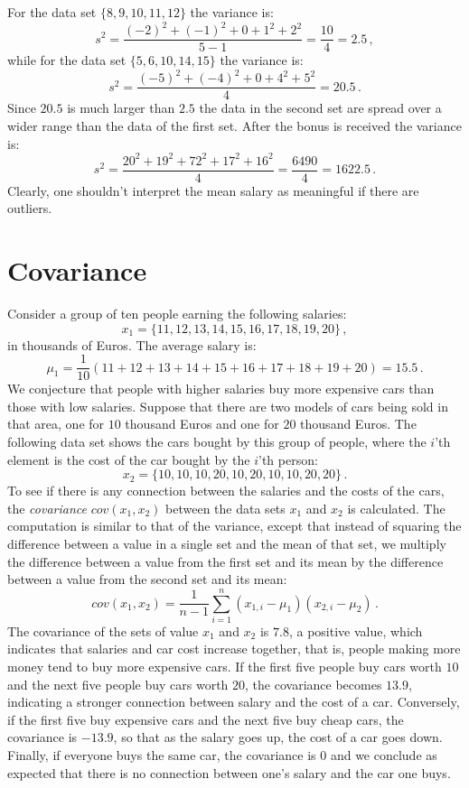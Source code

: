 For the data set $\{8,9,10,11,12\}$ the variance is:
\[
s^2 = \frac{(-2)^2+(-1)^2+0+1^2+2^2}{5-1} = \frac{10}{4} = 2.5\,,
\]
while for the data set $\{5,6,10,14,15\}$ the variance is:
\[
s^2 = \frac{(-5)^2+(-4)^2+0+4^2+5^2}{4} = 20.5\,.
\]
Since $20.5$ is much larger than $2.5$ the data in the second set are spread over a wider range than the data of the first set. After the bonus is received the variance is:
\[
s^2 = \frac{20^2+19^2+72^2+17^2+16^2}{4} = \frac{6490}{4} = 1622.5\,.
\]
Clearly, one shouldn't interpret the mean salary as meaningful if there are outliers.

\section{Covariance}\label{a.covariance}

Consider a group of ten people earning the following salaries:
\[x_1=\{11,12,13,14,15,16,17,18,19,20\}\,,
\]
in thousands of Euros. The average salary is:
\[
\mu_1=\frac{1}{10}(11+12+13+14+15+16+17+18+19+20)=15.5\,.
\]
We conjecture that people with higher salaries buy more expensive cars than those with low salaries. Suppose that there are two models of cars being sold in that area, one for $10$ thousand Euros and one for $20$ thousand Euros. The following data set shows the cars bought by this group of people, where the $i$'th element is the cost of the car bought by the $i$'th person:
\[
x_2=\{10,10,10,20,10,20,10,10,20,20\}\,.
\]
To see if there is any connection between the salaries and the costs of the cars, the \emph{covariance} $\textit{cov}(x_1,x_2)$ between the data sets $x_1$ and $x_2$ is calculated. The computation is similar to that of the variance, except that instead of squaring the difference between a value in a single set and the mean of that set, we multiply the difference between a value from the first set and its mean by the difference between a value from the second set and its mean:
\[
\textit{cov}(x_1,x_2) = \frac{1}{n-1}\sum^n_{i=1} (x_{1,i}-\mu_1)(x_{2,i}-\mu_2)\,.\label{eq.cov}
\]
The covariance of the sets of value $x_1$ and $x_2$ is $7.8$, a positive value, which indicates that salaries and car cost increase together, that is, people making more money tend to buy more expensive cars. If the first five people buy cars worth $10$ and the next five people buy cars worth $20$, the covariance becomes $13.9$, indicating a stronger connection between salary and the cost of a car. Conversely, if the first five buy expensive cars and the next five buy cheap cars, the covariance is $-13.9$, so that as the salary goes up, the cost of a car goes down. Finally, if everyone buys the same car, the covariance is $0$ and we conclude as expected that there is no connection between one's salary and the car one buys.

